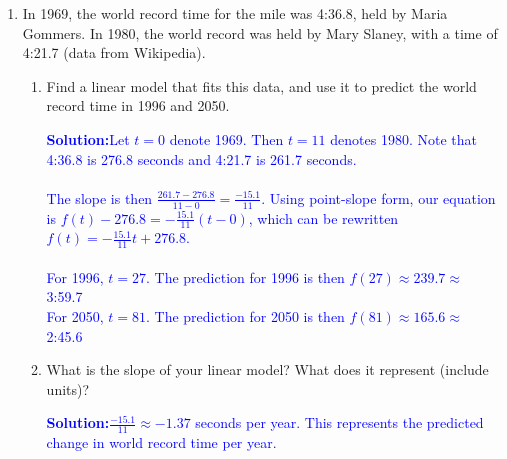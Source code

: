 \documentclass[letterpaper,11pt]{article}
\newcommand{\sol}[2]{\begin{minipage}[c][#1]{\linewidth}{\textcolor{blue}{\textbf{Solution:}}\quad \textcolor{blue}{#2}}\end{minipage}}
\newcommand{\sol}[2]{\begin{minipage}[c][#1]{\linewidth}{\vfill}\end{minipage}}
\begin{document}
\begin{enumerate}
\sol{4 in}{If there is one car per person, then the number of cars is equal to the number people. We need to come up with expressions for both of these values and determine the time in which they are equal. Let $c(t)$ be the number of cars and $p(t)$ be the number of people (in millions) in the US, and let $t=0$ be the year 2000.\\ 
Using the formula $Q(t)=Q_0(1+r)^t$, the formulas for the number of cars and the number of people are: 
$$c(t)=213(1.04)^t \hspace{2em} \text{and}\hspace{2em}p(t)=281(1.01)^t$$ 
Setting them equal and solving for $t$, we find:
\[213(1.04)^t=281(1.01)^t\implies\dfrac{(1.04)^t}{(1.01)^t}=\dfrac{281}{213}\implies \left(\dfrac{1.04}{1.01}\right)^t=\dfrac{281}{213} \] \\
\[t\ln\left(\dfrac{1.04}{1.01}\right)=\ln\left(\dfrac{281}{213}\right)\implies t=\frac{\ln\left(\dfrac{281}{213}\right)}{\ln\left(\dfrac{1.04}{1.01}\right)}\implies t\approx9.47 \text{ years}\]
So there will be one car per person half way through the year 2009.}


\newpage
\item In 1969, the world record time for the mile was 4:36.8, held by Maria Gommers.  In 1980, the world record was held by Mary Slaney, with a time of 4:21.7 (data from Wikipedia).
\begin{enumerate}
\item Find a linear model that fits this data, and use it to predict the world record time in 1996 and 2050.

\sol{1.6 in}{Let $t=0$ denote 1969. Then $t=11$ denotes 1980. Note that 4:36.8 is 276.8 seconds and 4:21.7 is 261.7 seconds. \\ \\
The slope is then $\frac{261.7-276.8}{11-0}=\frac{-15.1}{11}.$ Using point-slope form, our equation is $f(t)-276.8=-\frac{15.1}{11}(t-0)$, which can be rewritten $f(t)=-\frac{15.1}{11} t+276.8$. \\ \\
For 1996, $t=27$. The prediction for 1996 is then $f(27)\approx 239.7\approx$ 3:59.7 \\
For 2050, $t=81$. The prediction for 2050 is then $f(81)\approx 165.6\approx$ 2:45.6}

\item  What is the slope of your linear model?  What does it represent (include units)?

\sol{.5 in}{$\frac{-15.1}{11}\approx -1.37$ seconds per year. This represents the predicted change in world record time per year.}


\end{enumerate}
\end{enumerate}
\end{document}
